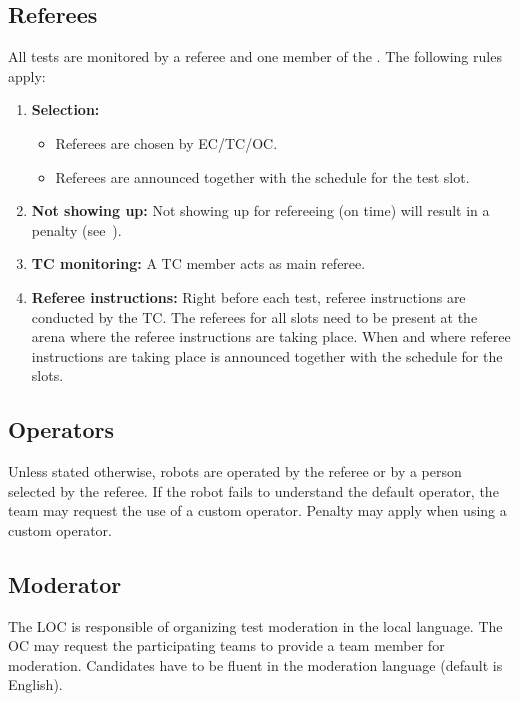 \subsection{Referees}
\label{rule:referees}
All tests are monitored by a referee and one member of the .
The following rules apply:

\begin{enumerate}
	\item \textbf{Selection:}
	\begin{itemize}
		\item Referees are chosen by EC/TC/OC.
		\item Referees are announced together with the schedule for the test slot.
	\end{itemize}

	\item \textbf{Not showing up:} Not showing up for refereeing (on time) will result in a penalty (see~).

	\item \textbf{TC monitoring:} A TC member acts as main referee.

	\item \textbf{Referee instructions:} Right before each test, referee instructions are conducted by the TC.
	The referees for all slots need to be present at the arena where the referee instructions are taking place.
	When and where referee instructions are taking place is announced together with the schedule for the slots.
\end{enumerate}


\subsection{Operators}
\label{rule:operator}
Unless stated otherwise, robots are operated by the referee or by a person selected by the referee.
If the robot fails to understand the default operator, the team may request the use of a custom operator.
Penalty may apply when using a custom operator.


\subsection{Moderator}
\label{rule:moderator}
The LOC is responsible of organizing test moderation in the local language.
The OC may request the participating teams to provide a team member for moderation.
Candidates have to be fluent in the moderation language (default is English).

